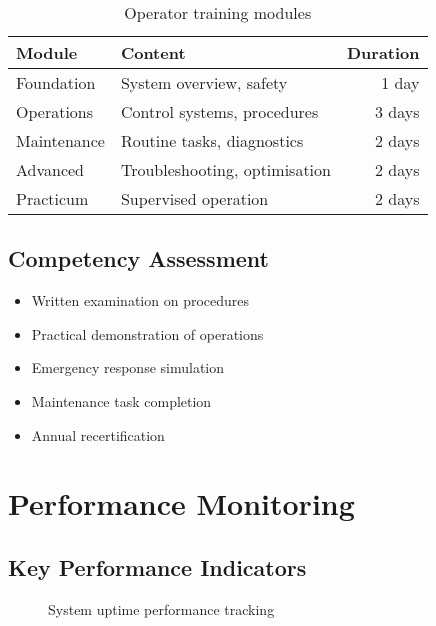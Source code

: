 \begin{table}[H]
\centering
\begin{tabularx}{\textwidth}{@{}lXr@{}}
\toprule
\textbf{Module} & \textbf{Content} & \textbf{Duration} \\
\midrule
Foundation & System overview, safety & 1 day \\
Operations & Control systems, procedures & 3 days \\
Maintenance & Routine tasks, diagnostics & 2 days \\
Advanced & Troubleshooting, optimisation & 2 days \\
Practicum & Supervised operation & 2 days \\
\bottomrule
\end{tabularx}
\caption{Operator training modules}
\end{table}

\subsection{Competency Assessment}

\begin{itemize}
    \item Written examination on procedures
    \item Practical demonstration of operations
    \item Emergency response simulation
    \item Maintenance task completion
    \item Annual recertification
\end{itemize}

\section{Performance Monitoring}

\subsection{Key Performance Indicators}

\begin{figure}[H]
\centering
\pgfplotsset{width=10cm, height=6cm}
\caption{System uptime performance tracking}
\end{figure}


